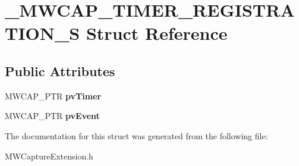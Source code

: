 \hypertarget{struct__MWCAP__TIMER__REGISTRATION__S}{\section{\-\_\-\-M\-W\-C\-A\-P\-\_\-\-T\-I\-M\-E\-R\-\_\-\-R\-E\-G\-I\-S\-T\-R\-A\-T\-I\-O\-N\-\_\-\-S Struct Reference}
\label{struct__MWCAP__TIMER__REGISTRATION__S}
}
\subsection*{Public Attributes}
\begin{DoxyCompactItemize}
\item 
\hypertarget{struct__MWCAP__TIMER__REGISTRATION__S_a42ba34552796d9e429798791784c0f5a}{M\-W\-C\-A\-P\-\_\-\-P\-T\-R {\bfseries pv\-Timer}}\label{struct__MWCAP__TIMER__REGISTRATION__S_a42ba34552796d9e429798791784c0f5a}

\item 
\hypertarget{struct__MWCAP__TIMER__REGISTRATION__S_a34586f5fd7cba74a72f2309903117a0e}{M\-W\-C\-A\-P\-\_\-\-P\-T\-R {\bfseries pv\-Event}}\label{struct__MWCAP__TIMER__REGISTRATION__S_a34586f5fd7cba74a72f2309903117a0e}

\end{DoxyCompactItemize}


The documentation for this struct was generated from the following file\-:\begin{DoxyCompactItemize}
\item 
M\-W\-Capture\-Extension.\-h\end{DoxyCompactItemize}
